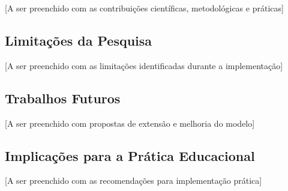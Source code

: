 \documentclass[12pt, a4paper, oneside, brazilian]{abntex2}
\begin{document}
[A ser preenchido com as contribuições científicas, metodológicas e práticas]

\subsection{Limitações da Pesquisa}

[A ser preenchido com as limitações identificadas durante a implementação]

\subsection{Trabalhos Futuros}

[A ser preenchido com propostas de extensão e melhoria do modelo]

\subsection{Implicações para a Prática Educacional}

[A ser preenchido com as recomendações para implementação prática]

\postextual

\end{document}
